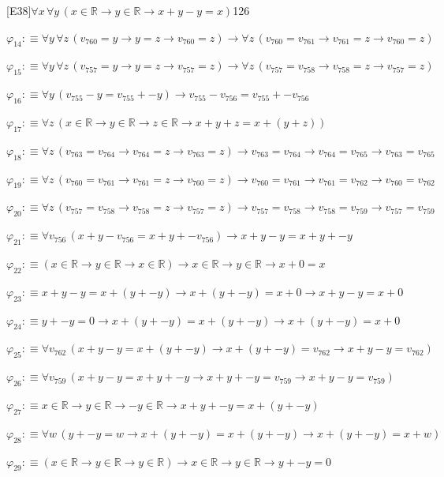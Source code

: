 \begin{fullproof}{[E38]}{$\forall x\,\forall y\,(x \in \mathbb{R} \to y \in \mathbb{R} \to x + y - y = x)$}{126}
\begin{abbrevlist}
\item $\varphi_{14} :\equiv \forall y\,\forall z\,(v_{760} = y \to y = z \to v_{760} = z) \to \forall z\,(v_{760} = v_{761} \to v_{761} = z \to v_{760} = z)$
\item $\varphi_{15} :\equiv \forall y\,\forall z\,(v_{757} = y \to y = z \to v_{757} = z) \to \forall z\,(v_{757} = v_{758} \to v_{758} = z \to v_{757} = z)$
\item $\varphi_{16} :\equiv \forall y\,(v_{755} - y = v_{755} + -y) \to v_{755} - v_{756} = v_{755} + -v_{756}$
\item $\varphi_{17} :\equiv \forall z\,(x \in \mathbb{R} \to y \in \mathbb{R} \to z \in \mathbb{R} \to x + y + z = x + (y + z))$
\item $\varphi_{18} :\equiv \forall z\,(v_{763} = v_{764} \to v_{764} = z \to v_{763} = z) \to v_{763} = v_{764} \to v_{764} = v_{765} \to v_{763} = v_{765}$
\item $\varphi_{19} :\equiv \forall z\,(v_{760} = v_{761} \to v_{761} = z \to v_{760} = z) \to v_{760} = v_{761} \to v_{761} = v_{762} \to v_{760} = v_{762}$
\item $\varphi_{20} :\equiv \forall z\,(v_{757} = v_{758} \to v_{758} = z \to v_{757} = z) \to v_{757} = v_{758} \to v_{758} = v_{759} \to v_{757} = v_{759}$
\item $\varphi_{21} :\equiv \forall v_{756}\,(x + y - v_{756} = x + y + -v_{756}) \to x + y - y = x + y + -y$
\item $\varphi_{22} :\equiv (x \in \mathbb{R} \to y \in \mathbb{R} \to x \in \mathbb{R}) \to x \in \mathbb{R} \to y \in \mathbb{R} \to x + 0 = x$
\item $\varphi_{23} :\equiv x + y - y = x + (y + -y) \to x + (y + -y) = x + 0 \to x + y - y = x + 0$
\item $\varphi_{24} :\equiv y + -y = 0 \to x + (y + -y) = x + (y + -y) \to x + (y + -y) = x + 0$
\item $\varphi_{25} :\equiv \forall v_{762}\,(x + y - y = x + (y + -y) \to x + (y + -y) = v_{762} \to x + y - y = v_{762})$
\item $\varphi_{26} :\equiv \forall v_{759}\,(x + y - y = x + y + -y \to x + y + -y = v_{759} \to x + y - y = v_{759})$
\item $\varphi_{27} :\equiv x \in \mathbb{R} \to y \in \mathbb{R} \to -y \in \mathbb{R} \to x + y + -y = x + (y + -y)$
\item $\varphi_{28} :\equiv \forall w\,(y + -y = w \to x + (y + -y) = x + (y + -y) \to x + (y + -y) = x + w)$
\item $\varphi_{29} :\equiv (x \in \mathbb{R} \to y \in \mathbb{R} \to y \in \mathbb{R}) \to x \in \mathbb{R} \to y \in \mathbb{R} \to y + -y = 0$

\end{abbrevlist}
\end{fullproof}
